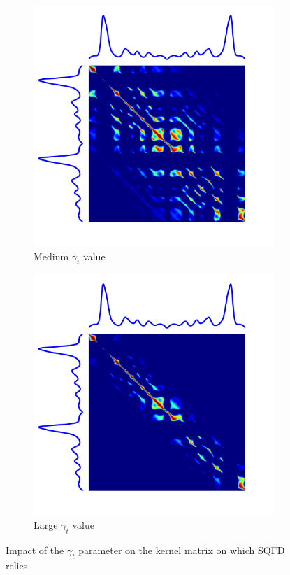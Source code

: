 \begin{figure}[t]
\begin{subfigure}[b]{0.3\textwidth}
          \includegraphics[width=\textwidth]{fig/gram_gammat10}
          \caption{Medium $\gamma_t$ value}
      \end{subfigure}
      \hfill
      \begin{subfigure}[b]{0.3\textwidth}
           \centering
           \includegraphics[width=\textwidth]{fig/gram_gammat100}
           \caption{Large $\gamma_t$ value}
       \end{subfigure}
    \caption{Impact of the $\gamma_t$ parameter on the kernel matrix on which
    SQFD relies.}
    \label{fig:gamma_t}
\end{figure}

